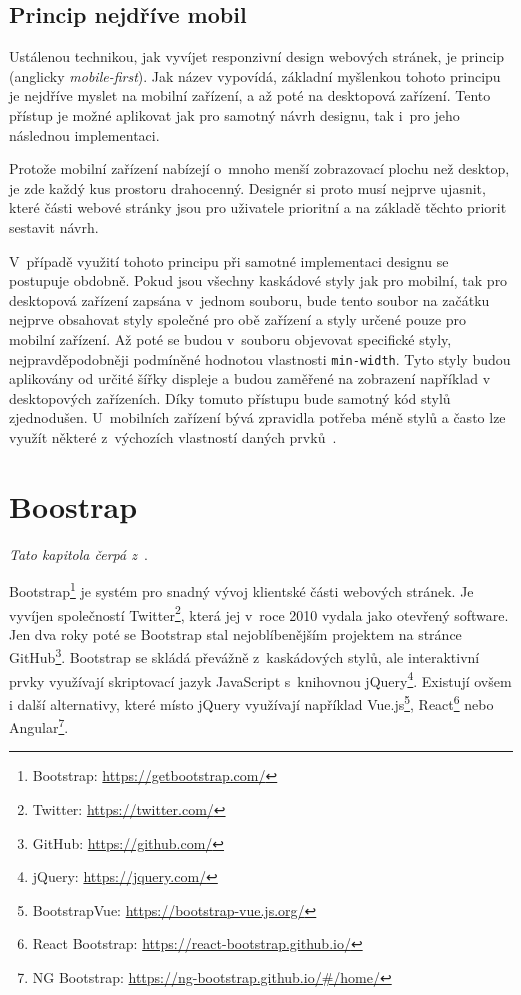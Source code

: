 \subsection{Princip nejdříve mobil}\label{section:mobile-first}
Ustálenou technikou, jak vyvíjet responzivní design webových stránek, je princip  (anglicky \emph{mobile-first}). Jak název vypovídá, základní myšlenkou tohoto principu je nejdříve myslet na mobilní zařízení, a až poté na desktopová zařízení. Tento přístup je možné aplikovat jak pro samotný návrh designu, tak i~pro jeho následnou implementaci.

Protože mobilní zařízení nabízejí o~mnoho menší zobrazovací plochu než desktop, je zde každý kus prostoru drahocenný. Designér si proto musí nejprve ujasnit, které části webové stránky jsou pro uživatele prioritní a na základě těchto priorit sestavit návrh.

V~případě využití tohoto principu při samotné implementaci designu se postupuje obdobně. Pokud jsou všechny kaskádové styly jak pro mobilní, tak pro desktopová zařízení zapsána v~jednom souboru, bude tento soubor na začátku nejprve obsahovat styly společné pro obě zařízení a styly určené pouze pro mobilní zařízení. Až poté se budou v~souboru objevovat specifické styly, nejpravděpodobněji podmíněné hodnotou vlastnosti \texttt{min-width}. Tyto styly budou aplikovány od určité šířky displeje a budou zaměřené na zobrazení například v desktopových zařízeních. Díky tomuto přístupu bude samotný kód stylů zjednodušen. U~mobilních zařízení bývá zpravidla potřeba méně stylů a často lze využít některé z~výchozích vlastností daných prvků~\cite{bib:mobile-first}.


\section{Boostrap}
\emph{Tato kapitola čerpá z~\cite{bib:bootstrap}}.

Bootstrap\footnote{Bootstrap: \url{https://getbootstrap.com/}} je systém pro snadný vývoj klientské části webových stránek. Je vyvíjen společností Twitter\footnote{Twitter: \url{https://twitter.com/}}, která jej v~roce 2010 vydala jako otevřený software. Jen dva roky poté se Bootstrap stal nejoblíbenějším projektem na stránce GitHub\footnote{GitHub: \url{https://github.com/}}. Bootstrap se skládá převážně z~kaskádových stylů, ale interaktivní prvky využívají skriptovací jazyk JavaScript s~knihovnou jQuery\footnote{jQuery: \url{https://jquery.com/}}. Existují ovšem i další alternativy, které místo jQuery využívají například Vue.js\footnote{BootstrapVue: \url{https://bootstrap-vue.js.org/}}, React\footnote{React Bootstrap: \url{https://react-bootstrap.github.io/}} nebo Angular\footnote{NG Bootstrap: \url{https://ng-bootstrap.github.io/\#/home/}}.

